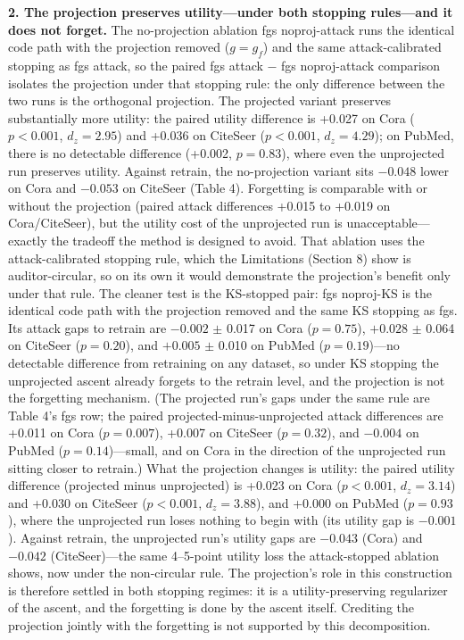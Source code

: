 \documentclass[pdflatex,sn-basic,Numbered]{sn-jnl}
\begin{document}
\textbf{2. The projection preserves utility---under both stopping rules---and it does not forget.} The no-projection ablation fgs noproj-attack runs the identical code path with the projection removed ($g = g_f$) and the same attack-calibrated stopping as fgs attack, so the paired fgs attack $-$ fgs noproj-attack comparison isolates the projection under that stopping rule: the only difference between the two runs is the orthogonal projection. The projected variant preserves substantially more utility: the paired utility difference is +0.027 on Cora ($p < 0.001$, $d_z = 2.95$) and +0.036 on CiteSeer ($p < 0.001$, $d_z = 4.29$); on PubMed, there is no detectable difference (+0.002, $p = 0.83$), where even the unprojected run preserves utility. Against retrain, the no-projection variant sits $-0.048$ lower on Cora and $-0.053$ on CiteSeer (Table 4). Forgetting is comparable with or without the projection (paired attack differences +0.015 to +0.019 on Cora/CiteSeer), but the utility cost of the unprojected run is unacceptable---exactly the tradeoff the method is designed to avoid. That ablation uses the attack-calibrated stopping rule, which the Limitations (Section 8) show is auditor-circular, so on its own it would demonstrate the projection's benefit only under that rule. The cleaner test is the KS-stopped pair: fgs noproj-KS is the identical code path with the projection removed and the same KS stopping as fgs. Its attack gaps to retrain are $-0.002$ $\pm$ 0.017 on Cora ($p = 0.75$), $+0.028$ $\pm$ 0.064 on CiteSeer ($p = 0.20$), and $+0.005$ $\pm$ 0.010 on PubMed ($p = 0.19$)---no detectable difference from retraining on any dataset, so under KS stopping the unprojected ascent already forgets to the retrain level, and the projection is not the forgetting mechanism. (The projected run's gaps under the same rule are Table 4's fgs row; the paired projected-minus-unprojected attack differences are +0.011 on Cora ($p = 0.007$), +0.007 on CiteSeer ($p = 0.32$), and $-0.004$ on PubMed ($p = 0.14$)---small, and on Cora in the direction of the unprojected run sitting closer to retrain.) What the projection changes is utility: the paired utility difference (projected minus unprojected) is +0.023 on Cora ($p < 0.001$, $d_z = 3.14$) and +0.030 on CiteSeer ($p < 0.001$, $d_z = 3.88$), and +0.000 on PubMed ($p = 0.93$), where the unprojected run loses nothing to begin with (its utility gap is $-0.001$). Against retrain, the unprojected run's utility gaps are $-0.043$ (Cora) and $-0.042$ (CiteSeer)---the same 4--5-point utility loss the attack-stopped ablation shows, now under the non-circular rule. The projection's role in this construction is therefore settled in both stopping regimes: it is a utility-preserving regularizer of the ascent, and the forgetting is done by the ascent itself. Crediting the projection jointly with the forgetting is not supported by this decomposition.
\end{document}

